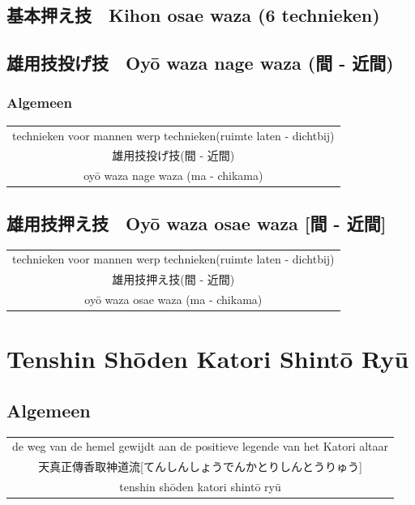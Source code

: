 \documentclass[12pt]{scrartcl}
\begin{document}
\begin{CJK*}{UTF8}{min}
\subsection{基本押え技　Kihon osae waza (6 technieken)}

\subsection{雄用技投げ技　Oy\={o} waza nage waza (間 - 近間)}
\subsubsection{Algemeen}
\begin{table}[H]
\begin{center}
\begin{tabular}{c}
technieken voor mannen werp technieken(ruimte laten - dichtbij)\\
雄用技投げ技(間 - 近間)\\
oy\={o} waza nage waza (ma - chikama)\\
\end{tabular}
\end{center}
\label{oyouwazanagewaza}
\end{table}

\subsection{雄用技押え技　Oy\={o} waza osae waza [間 - 近間]}
\begin{table}[H]
\begin{center}
\begin{tabular}{c}
technieken voor mannen werp technieken(ruimte laten - dichtbij)\\
雄用技押え技(間 - 近間)\\
oy\={o} waza osae waza (ma - chikama)\\
\end{tabular}
\end{center}
\label{oyouwazaosaewaza}
\end{table}

\newpage
\section{Tenshin Sh\={o}den Katori Shint\={o} Ry\={u}}
\subsection{Algemeen}
\begin{table}[H]
\begin{center}
\begin{tabular}{c}
de weg van de hemel gewijdt aan de positieve legende van het Katori altaar\\ 
天真正傳香取神道流[てんしんしょうでんかとりしんとうりゅう]\\
tenshin sh\={o}den katori shint\={o} ry\={u}
\end{tabular}
\end{center}
\label{katori}
\end{table}



\end{CJK*}
\end{document}

